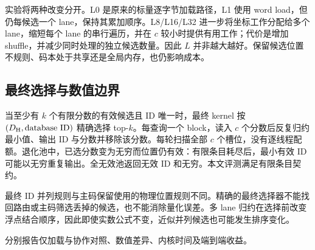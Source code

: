 实验将两种改变分开。L0 是原来的标量逐字节加载路径，L1 使用 word load，但仍每候选一个 lane，保持其累加顺序。L8/L16/L32 进一步将坐标工作分配给多个 lane，缩短每个 lane 的串行遍历，并在 $c$ 较小时提供有用工作；代价是增加 shuffle，并减少同时处理的独立候选数量。因此 $L$ 并非越大越好。保留候选位置不规则、码本处于共享还是全局内存，也仍影响成本。

\subsection{最终选择与数值边界}

当至少有 $k$ 个有限分数的有效候选且 ID 唯一时，最终 kernel 按 $(D_{\mathrm{H}},\mathrm{database\ ID})$ 精确选择 top-$k$。每查询一个 block，读入 $c$ 个分数后反复归约最小值、输出 ID 与分数并移除该分数。每轮扫描全部 $c$ 个槽位，没有逐线程配额。退化池中，已选分数变为无穷而位置仍有效：有限条目耗尽后，最小有效 ID 可能以无穷重复输出。全无效池返回无效 ID 和无穷。本文评测满足有限条目契约。

最终 ID 并列规则与主码保留使用的物理位置规则不同。精确的最终选择器不能找回路由或主码筛选丢掉的候选，也不能消除量化误差。多 lane 归约在选择前改变浮点结合顺序，因此即使实数公式不变，近似并列候选也可能发生排序变化。

分别报告仅加载与协作对照、数值差异、内核时间及端到端收益。
